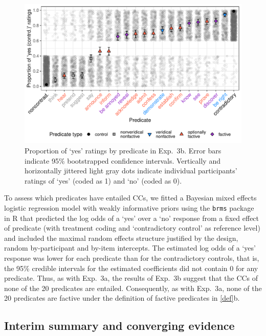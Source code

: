 \documentclass{language}
\newcommand{\6}{\mbox{$[\hspace*{-.6mm}[$}}
\newcommand{\9}{\mbox{$]\hspace*{-.6mm}]$}}
\begin{document}
\begin{figure}[h!]
\centering
\includegraphics[width=.7\paperwidth]{Language-figures/color/Figure15}
\caption{Proportion of `yes' ratings by predicate in Exp.~3b. Error bars indicate 95\% bootstrapped confidence intervals. Vertically and horizontally jittered light gray dots indicate individual participants' ratings of `yes' (coded as 1) and `no' (coded as 0). }
\label{fig:3bresults}
\end{figure}

To assess which predicates have entailed CCs, we fitted a Bayesian mixed effects logistic regression model with weakly informative priors using the \verb|brms|  package in R that predicted the log odds of a `yes' over a `no' response from a fixed effect of predicate (with treatment coding and `contradictory control' as  reference level) and included the maximal random effects structure justified by the design, random by-participant and by-item intercepts. The estimated log odds of a `yes' response was lower for each predicate than for the contradictory controls, that is, the 95\% credible intervals for the estimated coefficients did not contain 0 for any predicate. Thus, as with Exp.~3a, the results of Exp.~3b suggest that the CCs of none of the 20 predicates are entailed. Consequently, as with Exp.~3a, none of the 20 predicates are factive under the definition of factive predicates in \ref{def}b.

\subsection{Interim summary and converging evidence}\label{s33}
\end{document}
